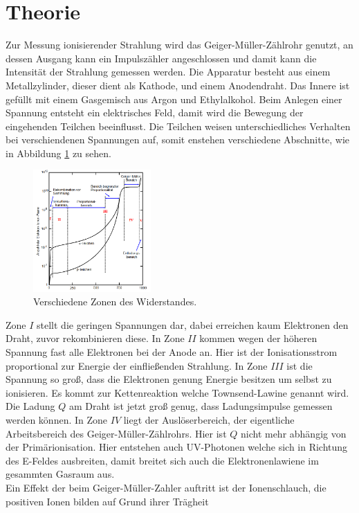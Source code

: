 \section{Theorie}
\label{sec:Theorie}
Zur Messung ionisierender Strahlung wird das Geiger-Müller-Zählrohr genutzt, an dessen Ausgang kann ein
Impulszähler angeschlossen und damit kann die Intensität der Strahlung gemessen werden.
Die Apparatur besteht aus einem Metallzylinder, dieser dient als Kathode, und einem Anodendraht. Das Innere ist gefüllt mit einem Gasgemisch
aus Argon und Ethylalkohol.
Beim Anlegen einer Spannung entsteht ein elektrisches Feld, damit wird die Bewegung der eingehenden Teilchen beeinflusst.
Die Teilchen weisen unterschiedliches Verhalten bei verschiendenen Spannungen auf, somit enstehen verschiedene Abschnitte, wie
in Abbildung \ref{fig:bereich} zu sehen.
\begin{figure}
  \centering
  \includegraphics[width=0.4\textwidth]{bereiche.PNG}
  \caption{Verschiedene Zonen des Widerstandes.\cite{sample}}
  \label{fig:bereich}
\end{figure}
Zone $I$ stellt die geringen Spannungen dar, dabei erreichen kaum Elektronen den Draht, zuvor rekombinieren diese.
In Zone $II$ kommen wegen der höheren Spannung fast alle Elektronen bei der Anode an. Hier ist der Ionisationsstrom proportional
zur Energie der einfließenden Strahlung.
In Zone $III$ ist die Spannung so groß, dass die Elektronen genung Energie besitzen um selbst zu ionisieren. Es kommt zur Kettenreaktion
welche Townsend-Lawine genannt wird. Die Ladung $Q$ am Draht ist jetzt groß genug, dass Ladungsimpulse gemessen werden können.
In Zone $IV$ liegt der Auslöserbereich, der eigentliche Arbeitsbereich des Geiger-Müller-Zählrohrs. Hier ist $Q$ nicht mehr abhängig
von der Primärionisation. Hier entstehen auch UV-Photonen welche sich in Richtung des E-Feldes ausbreiten, damit breitet sich auch die
Elektronenlawiene im gesammten Gasraum aus.\\
Ein Effekt der beim Geiger-Müller-Zahler auftritt ist der Ionenschlauch, die positiven Ionen bilden auf Grund ihrer Trägheit
